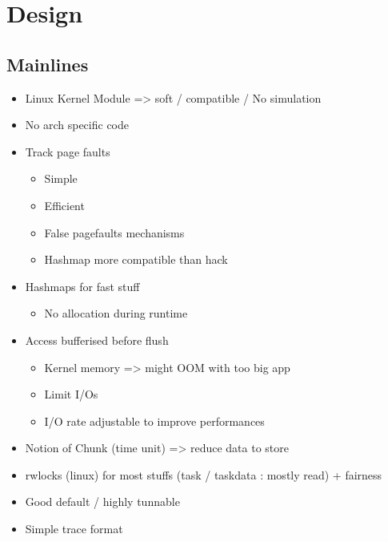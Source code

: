 \section{Design}
\label{sec:design}

\subsection{Mainlines}
\begin{itemize}
    \item Linux Kernel Module => soft / compatible / No simulation
    \item No arch specific code
    \item Track page faults
        \begin{itemize}
            \item Simple
            \item Efficient
            \item False pagefaults mechanisms
            \item Hashmap more compatible than hack
        \end{itemize}
    \item Hashmaps for fast stuff
        \begin{itemize}
            \item No allocation during runtime
        \end{itemize}
    \item Access bufferised before flush
        \begin{itemize}
            \item Kernel memory => might OOM with too big app
            \item Limit I/Os
            \item I/O rate adjustable to improve performances
        \end{itemize}
    \item Notion of Chunk (time unit) => reduce data to store
    \item rwlocks (linux) for most stuffs (task / taskdata : mostly read) + fairness
    \item Good default / highly tunnable
    \item Simple trace format
\end{itemize}

